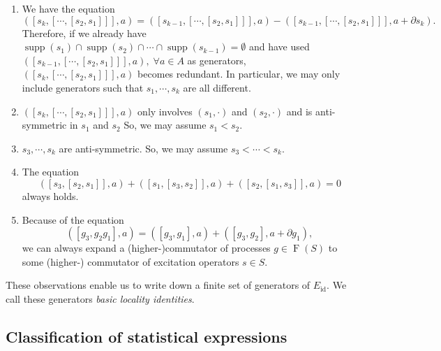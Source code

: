 \documentclass[reprint, amsmath, amssymb, showpacs, floatfix, longbibliography, aps, twocolumn, superscriptaddress, nofootinbib]{revtex4-2}
\newcommand{\id}{{\operatorname{id}}}
\theoremstyle{definition}
\begin{document}
\begin{widetext}
			\begin{enumerate}
			\item We have the equation
			\begin{equation}
				([s_k, [\cdots, [s_2, s_1]]], a)=([s_{k-1}, [\cdots, [s_2, s_1]]], a)-([s_{k-1}, [\cdots, [s_2, s_1]]], a+\partial s_k).
			\end{equation}	
			Therefore, if we already have \( \operatorname{supp}(s_1) \cap \operatorname{supp}(s_2) \cap \cdots \cap \operatorname{supp}(s_{k-1}) = \emptyset \) and have used $([s_{k-1}, [\cdots, [s_2, s_1]]], a),\;\forall a\in A$ as generators, $([s_k, [\cdots, [s_2, s_1]]], a)$ becomes redundant. In particular, we may only include generators such that $s_1,\cdots,s_k$ are all different.
			
			\item $([s_k, [\cdots, [s_2, s_1]]], a)$ only involves $(s_1,\cdot)$ and $(s_2,\cdot)$ and is anti-symmetric in $s_1$ and $s_2$ So, we may assume $s_1<s_2$.
			
			\item $s_3,\cdots,s_k$ are anti-symmetric. So, we may assume $s_3<\cdots<s_k$.
			
			\item The equation
			\begin{equation}
				([s_3,[s_2,s_1]],a)+([s_1,[s_3,s_2]],a)+([s_2,[s_1,s_3]],a)=0
			\end{equation}
			always holds.
			\item Because of the equation
			\begin{equation}\label{eqBilinearCommutator}
				([g_3,g_2g_1],a)=([g_3,g_1],a)+([g_3,g_2],a+\partial g_1),
			\end{equation} 
			we can always expand a (higher-)commutator of processes $g\in \operatorname{F}(S)$ to some (higher-) commutator of excitation operators $s\in S$.
		
		\end{enumerate}

These observations enable us to write down a finite set of generators of $E_\id$. We call these generators \textit{basic locality identities}.


\end{widetext}




\subsection{Classification of statistical expressions}\label{subsecDefinition}
\end{document}
